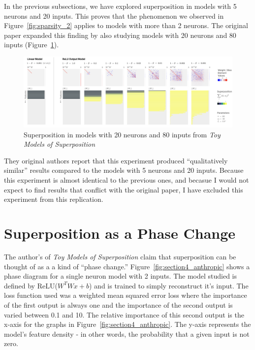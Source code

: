 \documentclass{article} %
\begin{document}
In the previous subsections, we have explored superposition in models with 5
neurons and 20 inputs. This proves that the phenomenon we observed in Figure~\ref{fig:sparsity_2}
applies to models with more than 2 neurons. The original paper expanded this 
finding by also studying models with 20 neurons and 80 inputs (Figure~\ref{fig:section3_anthropic2}). \\

\begin{figure}[h]
    \centering
    \includegraphics[width=0.99\linewidth]{demonstrating_superposition/images/anthropic_section3_part2.png}
    \captionsetup{font=footnotesize, width=0.7\linewidth} %
    \caption{
        Superposition in models with 20 neurons and 80 inputs from \textit{Toy Models of Superposition}\cite{elhage2022toy}
    }
    \label{fig:section3_anthropic2}
\end{figure}

They original authors report that this experiment produced ``qualitatively similar''
results compared to the models with 5 neurons and 20 inputs. Because this experiment 
is almost identical to the previous ones, and becasue I would not expect to find 
results that conflict with the original paper, I have excluded this experiment 
from this replication. \\

\section{Superposition as a Phase Change}

The author's of \textit{Toy Models of Superposition} claim that superposition
can be thought of as a a kind of ``phase change.'' Figure~\ref{fig:section4_anthropic}
shows a phase diagram for a single neuron model with 2 inputs. The model studied is
defined by ReLU($W^TWx + b$) and is trained to simply reconstruct it's input. The loss 
function used was a weighted mean squared error loss where the 
importance of the first output is always one and the importance of 
the second output is varied between 0.1 and 10. The relative importance of this
second output is the x-axis for the graphs in Figure~\ref{fig:section4_anthropic}.
The y-axis represents the model's feature density - in other words, the probability
that a given input is not zero.
\end{document}
